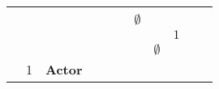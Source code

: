 \begin{table}[]
{\begin{tabular}{lllllllllll}
                          &                           &                   &                                                                          &                                                                        &                           &                                                             &                                                                            &                                                                           &                                 &                                                                        \\
                          &                           &                   &                                                                          &                                                                        &                           & \cellcolor[HTML]{FC8D59}$\emptyset$                         &                                                                            &                                                                           &                                 &                                                                        \\
                          &                           &                   &                                                                          &                                                                        &                           &                                                             &                                                                            & \cellcolor[HTML]{FC8D59}$1$                                               &                                 &                                                                        \\
                          &                           &                   &                                                                          &                                                                        &                           &                                                             & \cellcolor[HTML]{FC8D59}$\emptyset$                                        &                                                                           &                                 &                                                                        \\
                          & \cellcolor[HTML]{FC8D59}1 & \textbf{Actor}    &                                                                          &                                                                        &                           &                                                             &                                                                            &                                                                           &                                 &                                                                        \\

\end{tabular}}
\end{table}
